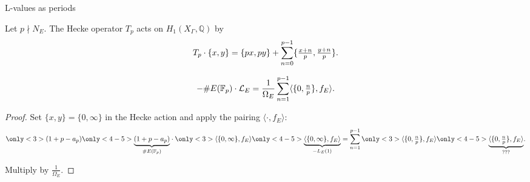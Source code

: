 \documentclass[10pt]{beamer}
\begin{document}
\begin{frame}[t]{L-values as periods}

Let $ p \nmid N_E $. The Hecke operator $ T_p $ acts on $ H_1(X_\Gamma, \mathbb{Q}) $ by
\vspace{-0.2cm} $$ \vspace{-0.2cm} T_p \cdot \{x, y\} = \{px, py\} + \sum_{n = 0}^{p - 1} \{\tfrac{x + n}{p}, \tfrac{y + n}{p}\}. $$

\pause

\begin{lemma}[Manin]
\vspace{-0.6cm} $$ \vspace{-0.6cm} -\#E(\mathbb{F}_p) \cdot \mathcal{L}_E = \dfrac{1}{\Omega_E}\sum_{n = 1}^{p - 1} \langle\{0, \tfrac{n}{p}\}, f_E\rangle. $$
\end{lemma}

\pause

\begin{proof}
Set $ \{x, y\} = \{0, \infty\} $ in the Hecke action and apply the pairing $ \langle\cdot, f_E\rangle $:
\vspace{-0.2cm} $$ \vspace{-0.2cm} \only<3>{(1 + p - a_p)}\only<4-5>{\underbrace{(1 + p - a_p)}_{\#E(\mathbb{F}_p)}} \cdot \only<3>{\langle\{0, \infty\}, f_E\rangle}\only<4-5>{\underbrace{\langle\{0, \infty\}, f_E\rangle}_{-L_E(1)}} = \sum_{n = 1}^{p - 1} \only<3>{\langle\{0, \tfrac{n}{p}\}, f_E\rangle}\only<4-5>{\underbrace{\langle\{0, \tfrac{n}{p}\}, f_E\rangle}_{???}}. $$

\pause\pause

Multiply by $ \tfrac{1}{\Omega_E} $.
\end{proof}

\end{frame}
\end{document}

